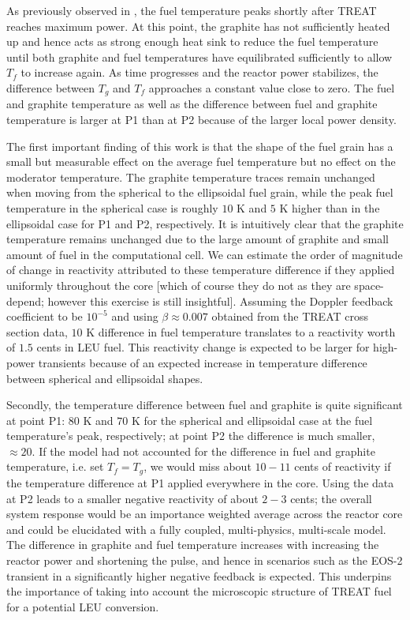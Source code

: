 \documentclass{anstrans}
\begin{document}
As previously observed in \cite{Mo2015}, the fuel temperature peaks shortly after TREAT reaches maximum power. At this point, the graphite has not sufficiently heated up and hence acts as strong enough heat sink to reduce the fuel temperature until both graphite and fuel temperatures have equilibrated sufficiently to allow $T_f$ to increase again. As time progresses and the reactor power stabilizes, the difference between $T_g$ and $T_f$ approaches a constant value close to zero. The fuel and graphite temperature as well as the difference between fuel and graphite temperature is larger at P1 than at P2 because of the larger local power density.

The first important finding of this work is that the shape of the fuel grain has a small but measurable effect on the average fuel temperature but no effect on the moderator temperature. The graphite temperature traces remain unchanged when moving from the spherical to the ellipsoidal fuel grain, while the peak fuel temperature in the spherical case is roughly $10$ K and $5$ K higher than in the ellipsoidal case for P1 and P2, respectively. It is intuitively clear that the graphite temperature remains unchanged due to the large amount of graphite and small amount of fuel in the computational cell. We can estimate the order of magnitude of change in reactivity attributed to these temperature difference if they applied uniformly throughout the core [which of course they do not as they are space-depend; however this exercise is still insightful]. Assuming the Doppler feedback coefficient to be $10^{-5}$ and using $\beta \approx 0.007$ obtained from the TREAT cross section data, $10$ K difference in fuel temperature translates to a reactivity worth of $1.5$ cents in LEU fuel. This reactivity change is expected to be larger for high-power transients because of an expected increase in temperature difference between spherical and ellipsoidal shapes.

Secondly, the temperature difference between fuel and graphite is quite significant at point P1: $80$ K and $70$ K for the spherical and ellipsoidal case at the fuel temperature's peak, respectively; at point P2 the difference is much smaller, $\approx20$. If the model had not accounted for the difference in fuel and graphite temperature, i.e. set $T_f = T_g$, we would miss about $10-11$ cents of reactivity if the temperature difference at P1 applied everywhere in the core. Using the data at P2 leads to a smaller negative reactivity of about $2-3$ cents; the overall system response would be an importance weighted average across the reactor core and could be elucidated with a fully coupled, multi-physics, multi-scale model. The difference in graphite and fuel temperature increases with increasing the reactor power and shortening the pulse, and hence in scenarios such as the EOS-2 transient in \cite{Mo2015} a significantly higher negative feedback is expected. This underpins the importance of taking into account the microscopic structure of TREAT fuel for a potential LEU conversion.
\end{document}
